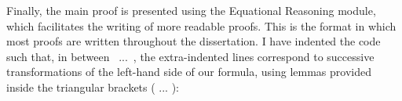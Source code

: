 \documentclass[12pt,twoside,notitlepage]{report}
\begin{document}
\begin{code}
\\
\> \AgdaSymbol{:} \AgdaSymbol{\{} \AgdaSymbol{:} \AgdaSymbol{\}}\<%
\\
\>[2]\<[14]%
\>[14] \AgdaSymbol{(} \AgdaSymbol{:}  \AgdaSymbol{)}\<%
\\
\>[2]\<[14]%
\>[14] \AgdaSymbol{(} \AgdaSymbol{:}  \AgdaSymbol{)}\<%
\\
\>[2]\<[14]%
\>[14]  \AgdaSymbol{(} \AgdaFunction{++} \AgdaSymbol{)}  \AgdaSymbol{(} \AgdaSymbol{)} \AgdaFunction{++} \AgdaSymbol{(} \AgdaSymbol{)}\<%
\\
\end{code}

Finally, the main proof is presented using the Equational Reasoning module, which facilitates the writing of more readable proofs. This is the format in which most proofs are written throughout the dissertation. I have indented the code such that, in between \mbox{ ...
}, the extra-indented lines correspond to successive transformations of the left-hand side of our formula, using lemmas provided inside the triangular brackets ( ... ):
\end{document}

